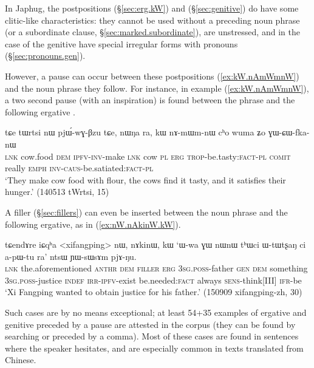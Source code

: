 In Japhug, the postpositions  (§\ref{sec:erg.kW}) and   (§\ref{sec:genitive}) do have some clitic-like characteristics: they cannot be used without a preceding noun phrase (or a subordinate clause, §\ref{sec:marked.subordinate}), are unstressed, and in the case of the genitive have special irregular forms with pronouns (§\ref{sec:pronouns.gen}).

However, a pause can occur between these postpositions (\ref{ex:kW.nAmWmnW}) and the noun phrase they follow. For instance, in example (\ref{ex:kW.nAmWmnW}), a two second pause (with an inspiration) is found between the phrase  and the following ergative . 

\begin{exe}
\ex \label{ex:kW.nAmWmnW}
\gll tɕe tɯrtsi nɯ pjɯ́-wɣ-βzu tɕe, nɯŋa ra, kɯ nɤ-mɯm-nɯ cʰo wuma ʑo ɣɯ-ɕɯ-fka-nɯ \\
\textsc{lnk} cow.food \textsc{dem} \textsc{ipfv}-\textsc{inv}-make \textsc{lnk} cow \textsc{pl} \textsc{erg} \textsc{trop}-be.tasty:\textsc{fact}-\textsc{pl} \textsc{comit} really \textsc{emph} \textsc{inv}-\textsc{caus}-be.satiated:\textsc{fact}-\textsc{pl} \\
\glt `They make cow food with flour, the cows find it tasty, and it satisfies their hunger.' (140513 tWrtsi, 15)
\end{exe}

A filler (§\ref{sec:fillers}) can even be inserted between the noun phrase and the following ergative, as in (\ref{ex:nW.nAkinW.kW}).

\begin{exe}
\ex \label{ex:nW.nAkinW.kW}
\gll  tɕendɤre iɕqʰa <xifangping> nɯ, nɤkinɯ, kɯ `ɯ-wa ɣɯ nɯnɯ tʰɯci ɯ-tɯtʂaŋ ci a-pɯ-tu ra' ntsɯ ɲɯ-sɯsɤm pjɤ-ŋu. \\
\textsc{lnk} the.aforementioned  \textsc{anthr} \textsc{dem} \textsc{filler} \textsc{erg} \textsc{3sg}.\textsc{poss}-father \textsc{gen} \textsc{dem} something \textsc{3sg}.\textsc{poss}-justice \textsc{indef} \textsc{irr}-\textsc{ipfv}-exist be.needed:\textsc{fact} always \textsc{sens}-think[III] \textsc{ifr}-be \\
\glt `Xi Fangping wanted to obtain justice for his father.' (150909 xifangping-zh, 30)
\end{exe}

Such cases are by no means exceptional; at least 54+35 examples of ergative and genitive preceded by a pause are attested in the corpus (they can be found by searching  or   preceded by a comma). Most of these cases are found in sentences where the speaker hesitates, and are especially common in texts translated from Chinese.

